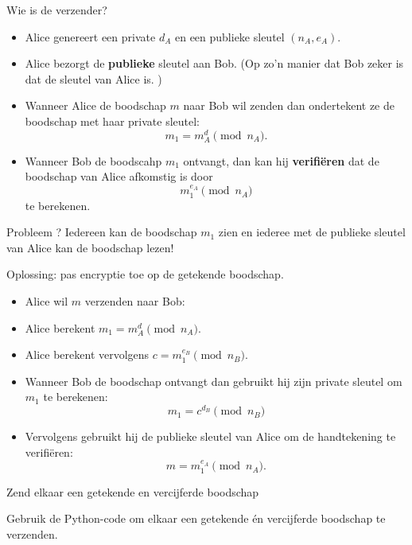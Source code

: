 \documentclass{beamer}
\begin{document}
\begin{frame}{Wie is de verzender?}
\begin{itemize}
	\item Alice genereert een private $d_A$ en een publieke sleutel $(n_A, e_A)$. 
	\pause\item  Alice bezorgt de \textbf{publieke} sleutel aan Bob. (Op zo'n manier
	dat Bob zeker is dat de sleutel van Alice is.
	)
	\pause \item Wanneer Alice de boodschap $m$ naar Bob wil zenden dan
	  	ondertekent ze de boodschap met haar private sleutel:
	  	\[
	  	m_1 = m^d_A \pmod{n_A}.
	  	\]
	\pause \item Wanneer Bob de boodscahp $m_1$ ontvangt, dan kan hij 
	\textbf{verifi\"eren} dat de boodschap van Alice afkomstig is 
	door 
	\[
	m_1^{e_A} \pmod{n_A}
	\]
	te berekenen.
\end{itemize}
\end{frame}

\begin{frame}{Probleem ?}
\pause Iedereen kan de boodschap $m_1$ zien en iederee met de publieke 
sleutel van Alice kan de boodschap lezen!

\vspace{0.5cm}
\pause Oplossing: pas encryptie toe op de getekende boodschap.
\begin{itemize}
	\item Alice wil $m$ verzenden naar Bob:
	\item Alice berekent $m_1 = m^d_A \pmod{n_A}$.
	\item Alice berekent vervolgens $c = m_1^{e_B} \pmod{n_B}$.
	\item Wanneer Bob de boodschap ontvangt dan gebruikt hij zijn private sleutel om $m_1$
	te berekenen:
	\[
	m_1 = c^{d_B} \pmod{n_B}
	\]
	\item Vervolgens gebruikt hij de publieke sleutel van Alice om de handtekening te verifi\"eren:
	\[
	m = m_1^{e_A} \pmod{n_A}.
	\]
\end{itemize}
\end{frame}


\begin{frame}{Zend elkaar een getekende en vercijferde boodschap}

Gebruik de Python-code om elkaar een getekende \'en vercijferde boodschap te verzenden.
\end{frame}





\end{document}
